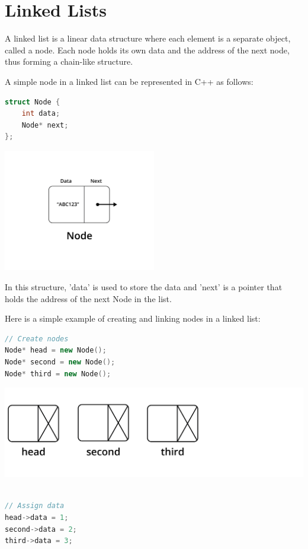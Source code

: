 \chapter{Linked Lists}

A linked list is a linear data structure where each element is a
separate object, called a node. Each node holds its own data and the
address of the next node, thus forming a chain-like structure.

A simple node in a linked list can be represented in C++ as follows:



\begin{lstlisting}[language=C++]
struct Node {
    int data;
    Node* next;
};
\end{lstlisting}

\includegraphics[width=0.5\textwidth]{node.png}


In this structure, 'data' is used to store the data and 'next' is a
pointer that holds the address of the next Node in the list.



Here is a simple example of creating and linking nodes in a linked
list:

\begin{lstlisting}[language=C++]
// Create nodes
Node* head = new Node();
Node* second = new Node();
Node* third = new Node();
\end{lstlisting}
\includegraphics[width=.75\textwidth]{llexample-03.png}

\begin{lstlisting}[language=C++]

// Assign data
head->data = 1;
second->data = 2;
third->data = 3;
\end{lstlisting}

